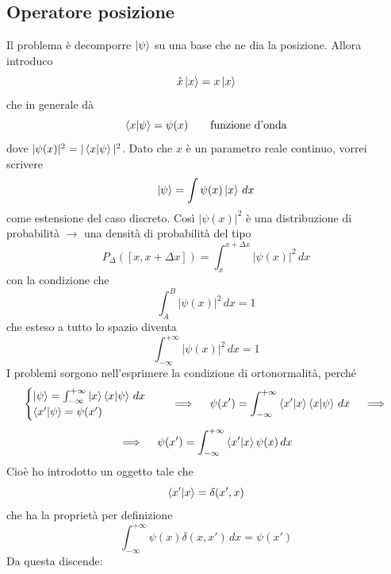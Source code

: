 \subsection{Operatore posizione}
Il problema è decomporre \(\ket{\psi}\) su una base che ne dia la posizione. Allora introduco
\[
\hat{x} \ket{x} = x \ket{x}
\]
che in generale dà
\[
\braket{x|\psi} = \psi(x) \qquad \text{funzione d'onda}
\]
dove \(|\psi(x)|^2 = |\braket{x|\psi}|^2\). Dato che \(x\) è un parametro reale continuo, vorrei scrivere
\[
\ket{\psi} = \int \psi(x) \ket{x} \, dx
\]
come estensione del caso discreto. Così \(|\psi(x)|^2\) è una distribuzione di probabilità \(\longrightarrow\) una densità di probabilità del tipo
\[
P_\Delta \left( [x, x + \Delta x] \right) = \int_x^{x + \Delta x} |\psi(x)|^2 \, dx
\]
con la condizione che
\[
\int_A^B |\psi(x)|^2 \, dx = 1
\]
che esteso a tutto lo spazio diventa
\[
\int_{-\infty}^{+\infty} |\psi(x)|^2 \, dx = 1
\]
I problemi sorgono nell'esprimere la condizione di ortonormalità, perché
\[
\begin{cases}
\ket{\psi} = \int_{-\infty}^{+\infty} \ket{x} \braket{x|\psi} \, dx \\
\braket{x'|\psi} = \psi(x')
\end{cases} \quad \implies \quad \psi(x') = \int_{-\infty}^{+\infty} \braket{x'|x} \braket{x|\psi} \, dx \quad \implies
\]
\[
\implies \quad \psi(x') = \int_{-\infty}^{+\infty} \braket{x'|x} \psi(x) \, dx
\]
Cioè ho introdotto un oggetto tale che
\[
\braket{x'|x} = \delta(x',x)
\]
che ha la proprietà per definizione
\[
\int_{-\infty}^{+\infty} \psi(x) \delta(x, x') \, dx = \psi(x')
\]
Da questa discende:
